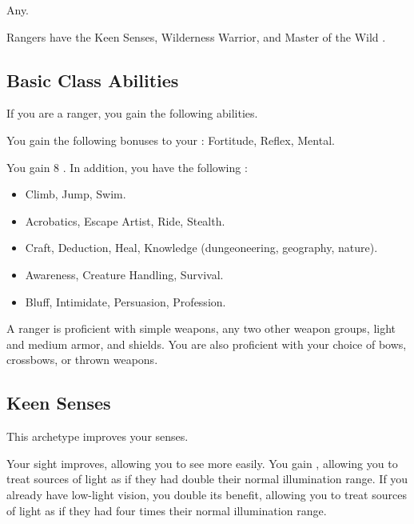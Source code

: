      Any.

     Rangers have the Keen Senses, Wilderness Warrior, and Master of the Wild .

    \subsection{Basic Class Abilities}
        If you are a ranger, you gain the following abilities.

        You gain the following bonuses to your :  Fortitude,  Reflex,  Mental.

        You gain 8 .
        In addition, you have the following :
        \begin{itemize}
            \item {} Climb, Jump, Swim.
            \item {} Acrobatics, Escape Artist, Ride, Stealth.
            \item {} Craft, Deduction, Heal, Knowledge (dungeoneering, geography, nature).
            \item {} Awareness, Creature Handling, Survival.
            \item {} Bluff, Intimidate, Persuasion, Profession.
        \end{itemize}

        A ranger is proficient with simple weapons, any two other weapon groups, light and medium armor, and shields.
        You are also proficient with your choice of bows, crossbows, or thrown weapons.

    \subsection{Keen Senses}
        This archetype improves your senses.

        Your sight improves, allowing you to see more easily.
        You gain , allowing you to treat sources of light as if they had double their normal illumination range.
        If you already have low-light vision, you double its benefit, allowing you to treat sources of light as if they had four times their normal illumination range.

